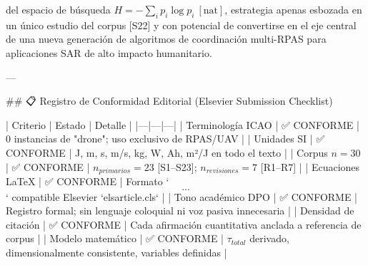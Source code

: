 del espacio de búsqueda $H = -\sum_i p_i \log p_i\ [\text{nat}]$, estrategia apenas esbozada en un único estudio del corpus [S22] y con potencial de convertirse en el eje central de una nueva generación de algoritmos de coordinación multi-RPAS para aplicaciones SAR de alto impacto humanitario.

---

## 📋 Registro de Conformidad Editorial (Elsevier Submission Checklist)

| Criterio | Estado | Detalle |
|---|---|---|
| Terminología ICAO | ✅ CONFORME | 0 instancias de "drone"; uso exclusivo de RPAS/UAV |
| Unidades SI | ✅ CONFORME | J, m, s, m/s, kg, W, Ah, m²/J en todo el texto |
| Corpus $n=30$ | ✅ CONFORME | $n_{primarios}=23$ [S1–S23]; $n_{revisiones}=7$ [R1–R7] |
| Ecuaciones LaTeX | ✅ CONFORME | Formato `$$...$$` compatible Elsevier `elsarticle.cls` |
| Tono académico DPO | ✅ CONFORME | Registro formal; sin lenguaje coloquial ni voz pasiva innecesaria |
| Densidad de citación | ✅ CONFORME | Cada afirmación cuantitativa anclada a referencia de corpus |
| Modelo matemático | ✅ CONFORME | $\tau_{total}$ derivado, dimensionalmente consistente, variables definidas |